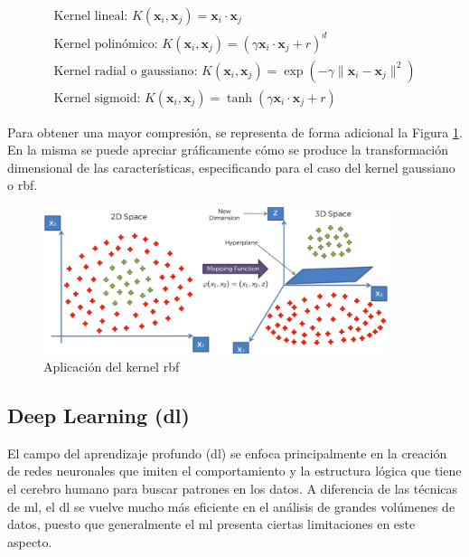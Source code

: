 \begin{equation}
    \begin{aligned}
        \text{Kernel lineal: } K(\mathbf{x}_i, \mathbf{x}_j) = \mathbf{x}_i \cdot \mathbf{x}_j \\
        \text{Kernel polinómico: } K(\mathbf{x}_i, \mathbf{x}_j) = (\gamma \mathbf{x}_i \cdot \mathbf{x}_j + r)^d \\
        \text{Kernel radial o gaussiano: } K(\mathbf{x}_i, \mathbf{x}_j) = \exp \left( -\gamma \| \mathbf{x}_i - \mathbf{x}_j \|^2 \right) \\
        \text{Kernel sigmoid: } K(\mathbf{x}_i, \mathbf{x}_j) = \tanh(\gamma \mathbf{x}_i \cdot \mathbf{x}_j + r)
    \end{aligned}
\end{equation}


\vspace{3mm}

Para obtener una mayor compresión, se representa de forma adicional la Figura \ref{fig:rbf}. En la misma se puede apreciar gráficamente cómo se produce la transformación dimensional de las características, especificando para el caso del kernel gaussiano o \gls{rbf}.

\vspace{3mm}

\begin{figure}[H]
    \centering
    \includegraphics[width=0.9\textwidth]{img/teoria/rbf.png}
    \caption{Aplicación del kernel \acrshort{rbf} \cite{rbf}}
    \label{fig:rbf}
\end{figure}

\subsection{Deep Learning (\acrshort{dl})}
\label{sec:dl}

El campo del aprendizaje profundo (\acrfull{dl}) se enfoca principalmente en la creación de redes neuronales que imiten el comportamiento y la estructura lógica que tiene el cerebro humano para buscar patrones en los datos. A diferencia de las técnicas de \gls{ml}, el \gls{dl} se vuelve mucho más eficiente en el análisis de grandes volúmenes de datos, puesto que generalmente el \gls{ml} presenta ciertas limitaciones en este aspecto. \cite{metal} 


